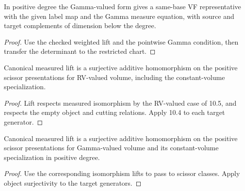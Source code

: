 \begin{theorem}
\label{thm:measured-isomorphisms-gamma}
\leanok
In positive degree the Gamma-valued form gives a same-base VF
representative with the given label map and the Gamma measure
equation, with source and target complements of dimension below the
degree.
\end{theorem}
\begin{proof}
\leanok
{}
Use the checked weighted lift and the pointwise Gamma condition,
then transfer the determinant to the restricted chart.
\end{proof}

\begin{corollary}
\label{cor:measured-scissors-rv}
\leanok
Canonical measured lift is a surjective additive homomorphism on the
positive scissor presentations for RV-valued volume, including the
constant-volume specialization.
\end{corollary}
\begin{proof}
\leanok
{}
Lift respects measured isomorphism by the RV-valued case of 10.5,
and respects the empty object and cutting relations. Apply 10.4
to each target generator.
\end{proof}

\begin{corollary}
\label{cor:measured-scissors-gamma}
\leanok
Canonical measured lift is a surjective additive homomorphism on
the positive scissor presentations for Gamma-valued volume and its
constant-volume specialization in positive degree.
\end{corollary}
\begin{proof}
\leanok
{}
Use the corresponding isomorphism lifts to pass to scissor classes.
Apply object surjectivity to the target generators.
\end{proof}

